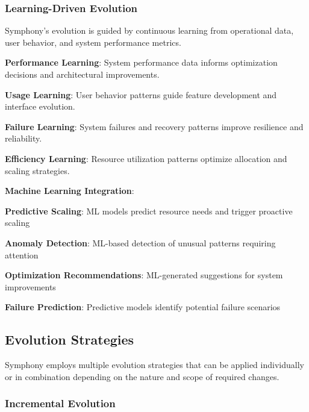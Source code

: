 \subsubsection*{Learning-Driven Evolution}

Symphony's evolution is guided by continuous learning from operational data, user behavior, and system performance metrics.

\begin{infobox}[title=Learning Feedback Loops]
\textbf{Performance Learning}: System performance data informs optimization decisions and architectural improvements.

\textbf{Usage Learning}: User behavior patterns guide feature development and interface evolution.

\textbf{Failure Learning}: System failures and recovery patterns improve resilience and reliability.

\textbf{Efficiency Learning}: Resource utilization patterns optimize allocation and scaling strategies.
\end{infobox}

\textbf{Machine Learning Integration}:
\begin{compactlist}
    \item \textbf{Predictive Scaling}: ML models predict resource needs and trigger proactive scaling
    \item \textbf{Anomaly Detection}: ML-based detection of unusual patterns requiring attention
    \item \textbf{Optimization Recommendations}: ML-generated suggestions for system improvements
    \item \textbf{Failure Prediction}: Predictive models identify potential failure scenarios
\end{compactlist}

\subsection*{Evolution Strategies}

Symphony employs multiple evolution strategies that can be applied individually or in combination depending on the nature and scope of required changes.

\subsubsection*{Incremental Evolution}

